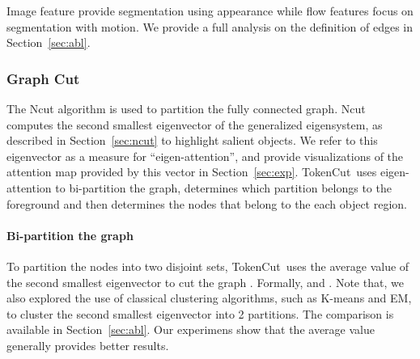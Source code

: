 \documentclass[twocolumn]{article}
\newcommand{\name} {TokenCut}
\begin{document}
Image feature provide segmentation using appearance while flow features focus on segmentation with motion. We provide a full analysis on the definition of edges in Section~\ref{sec:abl}. 








\subsubsection{Graph Cut}
 
The Ncut algorithm is used to partition the fully connected graph. Ncut computes the  second smallest eigenvector of the generalized eigensystem, as described in Section~\ref{sec:ncut} to highlight salient objects. 
We refer to this eigenvector as a measure for ``eigen-attention'', 
and provide visualizations of the attention map provided by this vector in Section~\ref{sec:exp}. 
\name~uses eigen-attention  to bi-partition the graph,  determines which partition belongs to the foreground and then determines the nodes that belong to the each object region.



\paragraph*{Bi-partition the graph}
To partition the nodes into two disjoint sets, \name~uses the average value of the second smallest eigenvector to cut the graph . Formally,  and . Note that, we also explored the use of classical clustering algorithms, such as K-means and EM, to cluster the second smallest eigenvector into 2 partitions. The comparison is available in Section~\ref{sec:abl}. Our experimens show that the average value generally provides better results.
\end{document}
